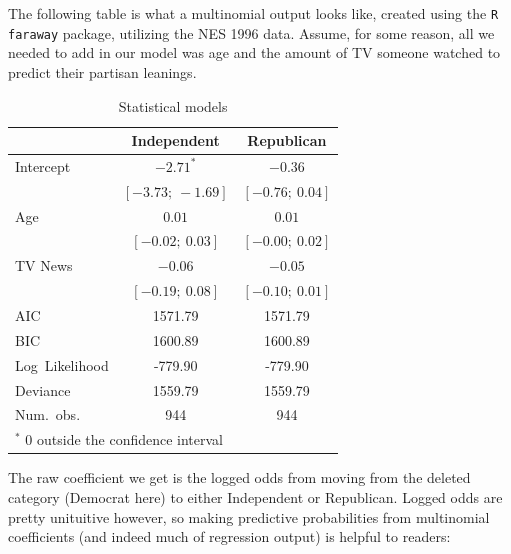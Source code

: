 \documentclass[12pt]{article}\usepackage[]{graphicx}\usepackage[]{color}
\begin{document}
\begin{flushleft}
The following table is what a multinomial output looks like, created using the \texttt{R faraway} package, utilizing the NES 1996 data. Assume, for some reason, all we needed to add in our model was age and the amount of TV someone watched to predict their partisan leanings. \\



\begin{table}[h!]
\caption{Statistical models}
\begin{center}
\begin{tabular}{l c c }
\hline
 & Independent & Republican \\
\hline
Intercept       & $\mathbf{-2.71}^{*}$ & $-0.36$          \\
                & $[-3.73;\ -1.69]$    & $[-0.76;\ 0.04]$ \\
Age             & $0.01$               & $0.01$           \\
                & $[-0.02;\ 0.03]$     & $[-0.00;\ 0.02]$ \\
TV News         & $-0.06$              & $-0.05$          \\
                & $[-0.19;\ 0.08]$     & $[-0.10;\ 0.01]$ \\
\hline
AIC             & 1571.79              & 1571.79          \\
BIC             & 1600.89              & 1600.89          \\
Log\ Likelihood & -779.90              & -779.90          \\
Deviance        & 1559.79              & 1559.79          \\
Num.\ obs.      & 944                  & 944              \\
\hline
\multicolumn{3}{l}{\scriptsize{$^*$ 0 outside the confidence interval}}
\end{tabular}
\end{center}
\end{table}

The raw coefficient we get is the logged odds from moving from the deleted category (Democrat here) to either Independent or Republican. Logged odds are pretty unituitive however, so making predictive probabilities from multinomial coefficients (and indeed much of regression output) is helpful to readers:


\end{flushleft}
\end{document}
